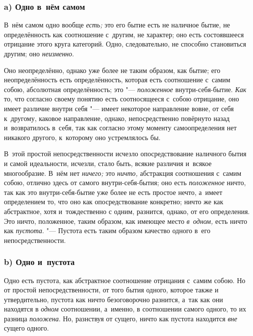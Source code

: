 \subsubsection[a) Одно в~нём самом]{\centering a) Одно в~нём самом}

В~нём самом одно вообще {\em есть;} это его бытие есть
не наличное бытие, не определённость как соотношение с~другим, не характер;
оно есть состоявшееся отрицание этого круга категорий. Одно, следовательно,
не способно становиться другим; оно {\em неизменно}.

Оно неопределённо, однако уже более не таким образом, как бытие; его
неопределённость есть определённость, которая есть соотношение с~самим
собою, абсолютная определённость; это
"--- {\em положенное} внутри-себя-бытие.
{\em Как} то, что согласно своему понятию есть
соотносящееся с~собою отрицание, оно имеет различие внутри себя "--- имеет
некоторое направление вовне, от себя к~другому, каковое направление,
однако, непосредственно повёрнуто назад и~возвратилось в~себя, так как
согласно этому моменту самоопределения нет никакого другого, к~которому оно
устремлялось бы.

В~этой простой непосредственности исчезло опосредствование наличного бытия и
самой идеальности, исчезли, стало быть, всякие различия и~всякое
многообразие. В~нём нет {\em ничего;} это
{\em ничто,} абстракция соотношения с~самим собою,
отлично здесь от самого внутри-себя-бытия; оно есть
{\em положенное} ничто, так как это внутри-себя-бытие
уже более не есть простое нечто, а~имеет определением то, что оно как
опосредствование конкретно; ничто же как абстрактное, хотя и~тождественно с
одним, разнится, однако, от его определения. Это ничто, положенное, таким
образом, как имеющее место {\em в~одном,} есть ничто
как {\em пустота}. "--- Пустота есть таким образом
качество одного в~его непосредственности.

\subsubsection[b) Одно и~пустота]{\centering b) Одно и~пустота}

Одно есть пустота, как абстрактное соотношение отрицания с~самим собою. Но
от простой непосредственности, от того бытия одного, которое также и
утвердительно, пустота как ничто безоговорочно разнится, а~так как они
находятся в {\em одном} соотношении, а~именно, в
соотношении самого одного, то их разница
{\em положена}. Но, разнствуя от сущего, ничто как
пустота находится {\em вне} сущего одного.

